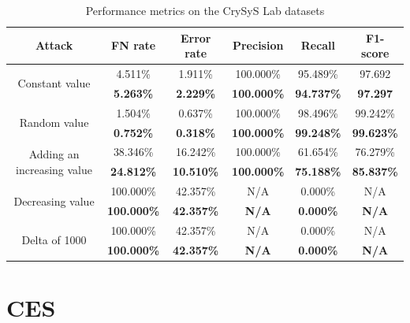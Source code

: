 \begin{table}
\begin{tabular}{*{6}{c}}
        \midrule
        \textbf{Attack} & \textbf{FN rate} & \textbf{Error rate} & \textbf{Precision} & \textbf{Recall} & \textbf{F1-score}\\
        \midrule
        \multirow{2}{*}{Constant value} & 4.511\% & 1.911\% & 100.000\% & 95.489\% & 97.692\\
        & \textbf{5.263\%} & \textbf{2.229\%} & \textbf{100.000\%} & \textbf{94.737\%} & \textbf{97.297}\\
        \multirow{2}{*}{Random value} & 1.504\% & 0.637\% & 100.000\% & 98.496\% & 99.242\%\\
        & \textbf{0.752\%} & \textbf{0.318\%} & \textbf{100.000\%} & \textbf{99.248\%} & \textbf{99.623\%}\\
        \multirow{2}{*}{Adding an increasing value} & 38.346\% & 16.242\% & 100.000\% & 61.654\% & 76.279\%\\
        & \textbf{24.812\%} & \textbf{10.510\%} & \textbf{100.000\%} & \textbf{75.188\%} & \textbf{85.837\%}\\
        \multirow{2}{*}{Decreasing value} & 100.000\% & 42.357\% & N/A & 0.000\% & N/A\\
        & \textbf{100.000\%} & \textbf{42.357\%} & \textbf{N/A} & \textbf{0.000\%} & \textbf{N/A}\\
        \multirow{2}{*}{Delta of 1000} & 100.000\% & 42.357\% & N/A & 0.000\% & N/A\\
        & \textbf{100.000\%} & \textbf{42.357\%} & \textbf{N/A} & \textbf{0.000\%} & \textbf{N/A}\\
        \bottomrule
    \end{tabular}
    \caption{Performance metrics on the CrySyS Lab datasets}
    \label{tab:perf_crysys}
\end{table}

\section{CES}

